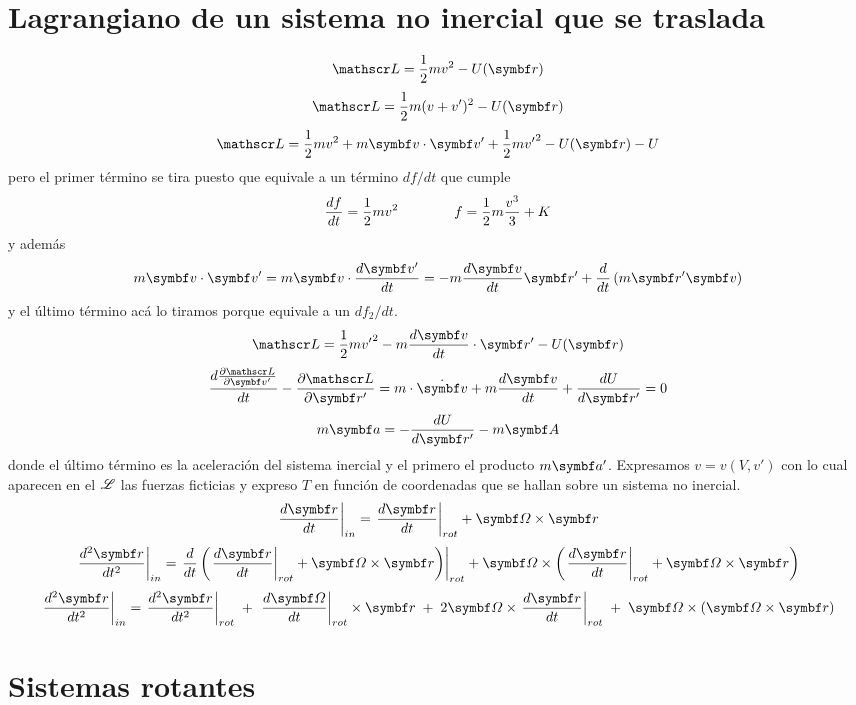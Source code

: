 \documentclass[10pt,oneside]{CBFT_book}
\begin{document}
\section{Lagrangiano de un sistema no inercial que se traslada}

\[
	\Lag = \frac{1}{2} m v^2 - U(\vb{r})
\]
\[
	\Lag = \frac{1}{2} m ( v + v' )^2 - U(\vb{r})
\]
\[
	\Lag = \frac{1}{2} m  v^2 + m \vb{v}\cdot\vb{v}' +\frac{1}{2} m {v'}^2 - U(\vb{r}) - U
\]
pero el primer término se  tira puesto que equivale a un término $df/dt$ que cumple 
\[
	\frac{d^{\hspace{-0.05em}} {f}}{d {t}^{\hspace{-0.05em}}} = \frac{1}{2} m  v^2 \qquad \qquad f = \frac{1}{2} m  \frac{v^3}{3} + K
\]
y además 
\[
	 m \vb{v}\cdot\vb{v}' =  m \vb{v}\cdot \dtot{\vb{v}'}{t} = - m \dtot{\vb{v}}{t} \vb{r}' 
				+ \frac{d}{dt}\left( m \vb{r}' \vb{v} \right)
\]
y el último término acá lo tiramos porque equivale a un $df_2/dt$.
\[
	\Lag = \frac{1}{2} m {v'}^2 - m \dtot{\vb{v}}{t}\cdot\vb{r}' - U(\vb{r})
\]
\[
	\dtot{\dpar{\Lag}{\vb{v}'}}{t} -\dpar{\Lag}{\vb{r}'} =
		m\cdot\dot{\vb{v}} + m \dtot{\vb{v}}{t} + \dtot{U}{\vb{r}'} = 0
\]
\[
	m \vb{a} = -\dtot{U}{\vb{r}'} - m \vb{A}
\]
donde el último término es la aceleración del sistema inercial y el primero el producto $m\vb{a}'$.
Expresamos $v=v(V,v')$ con lo cual aparecen en el $\mathscr{L}$ las fuerzas ficticias y expreso $T$ en 
función de coordenadas que se hallan sobre un sistema no inercial.
\[
	\left. \dtot{\vb{r}}{t} \right|_{in} = \left. \dtot{\vb{r}}{t} \right|_{rot} + \vb{\Omega} \times \vb{r}
\]
\[
	\left. \dtot[2]{\vb{r}}{t} \right|_{in} = 
	\left. \frac{d}{dt}\left( \left. \dtot{\vb{r}}{t} \right|_{rot} + \vb{\Omega} \times \vb{r} \right) \right|_{rot}
	+ \vb{\Omega} \times \left( \left. \dtot{\vb{r}}{t} \right|_{rot} + \vb{\Omega} \times \vb{r} \right)
\]
\[
	\left. \dtot[2]{\vb{r}}{t} \right|_{in} = 
	\left. \dtot[2]{\vb{r}}{t} \right|_{rot}  \; +  \; \left.\dtot{\vb{\Omega}}{t}\right|_{rot} \times \vb{r}
	 \;  + \; 2 \vb{\Omega} \times \left. \dtot{\vb{r}}{t} \right|_{rot} 
	 \;  + \;  \vb{\Omega} \times \left( \vb{\Omega} \times \vb{r} \right)
\]

\section{Sistemas rotantes}
\end{document}
